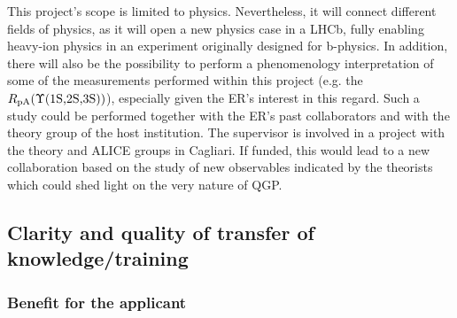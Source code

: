 \documentclass[a4paper,11pt]{article}
\newcommand{\ER}{ER\xspace}
\newcommand{\Supervisor}{The supervisor\xspace}
\begin{document}
This project's scope is limited to physics. Nevertheless, it will connect different fields of physics, as it will open a new physics case in a LHCb, fully enabling heavy-ion physics in an experiment originally designed for b-physics.
In addition, there will also be the possibility to perform a phenomenology interpretation of some of the measurements performed within this project (e.g. the $R_{\text{pA}}(\Upsilon\text{(1S,2S,3S)})$), especially given the \ER's interest in this regard. Such a study could be performed together with the \ER's past collaborators and with the theory group of the host institution. \Supervisor is involved in a project with the theory and ALICE  groups in Cagliari. If funded, this would lead to a new collaboration based on the study of new observables indicated by the theorists which could shed light on the very nature of QGP.

%       

\subsection{Clarity and quality of transfer of knowledge/training}



\subsubsection{Benefit for the applicant}
\label{sec:benefitapplicant}
\end{document}
